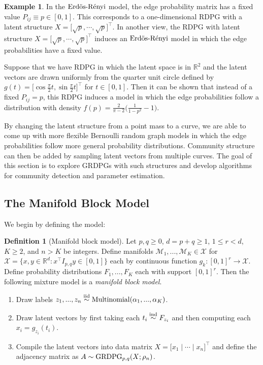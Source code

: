 \documentclass[
  12pt,
]{article}
\theoremstyle{definition}
\newtheorem{definition}{Definition}[section]
\theoremstyle{definition}
\newtheorem{example}{Example}[section]
\theoremstyle{definition}
\theoremstyle{definition}
\theoremstyle{remark}
\begin{document}
\begin{example}
\label{ex:er-curve}
In the $\text{Erd\"{o}s-R\'{e}nyi}$ model, the edge probability matrix has a fixed value $P_{ij} \equiv p \in [0, 1]$. 
This corresponds to a one-dimensional RDPG with a latent structure $X = \Big[ \sqrt{p},  \cdots, \sqrt{p} \Big]^\top$. 
In another view, the RDPG with latent structure $X = \Big[ \sqrt{p}, \cdots, \sqrt{p} \Big]^\top$ induces an $\text{Erd\"{o}s-R\'{e}nyi}$ model in which the edge probabilities have a fixed value. 

Suppose that we have RDPG in which the latent space is in $\mathbb{R}^2$ and the latent vectors are drawn uniformly from the quarter unit circle defined by $g(t) = \Big[ \cos \frac{\pi}{2} t, \sin \frac{\pi}{2} t \Big]^\top$ for $t \in [0, 1]$. 
Then it can be shown that instead of a fixed $P_{ij} = p$, this RDPG induces a model in which the edge probabilities follow a distribution with density $f(p) = \frac{2}{\pi - 2} \Big( \frac{1}{1 - p^2} - 1 \Big)$. 
\end{example}

By changing the latent structure from a point mass to a curve, we are able to come up with more flexible Bernoulli random graph models in which the edge probabilities follow more general probability distributions.
Community structure can then be added by sampling latent vectors from multiple curves.
The goal of this section is to explore GRDPGs with such structures and develop algorithms for community detection and parameter estimation.

\hypertarget{the-manifold-block-model}{%
\subsection{The Manifold Block Model}\label{the-manifold-block-model}}

We begin by defining the model:

\begin{definition}[Manifold block model]
\label{def:mbm}
Let $p, q \geq 0$, $d = p + q \geq 1$, $1 \leq r < d$, $K \geq 2$, and $n > K$ be integers. 
Define manifolds $\mathcal{M}_1, ..., \mathcal{M}_K \in \mathcal{X}$ for $\mathcal{X} = \{x, y \in \mathbb{R}^d : x^\top I_{p,q} y \in [0, 1]\}$ each by continuous function $g_k : [0, 1]^r \to \mathcal{X}$. 
Define probability distributions $F_1, ..., F_K$ each with support $[0, 1]^r$. 
Then the following mixture model is a {\em manifold block model}.

\begin{enumerate}
\item Draw labels $z_1, ..., z_n \stackrel{\mathrm{iid}}{\sim} \mathrm{Multinomial}(\alpha_1, ..., \alpha_K)$.
\item Draw latent vectors by first taking each $t_i \stackrel{\mathrm{ind}}{\sim} F_{z_i}$ and then computing each $x_i = g_{z_i}(t_i)$. 
\item Compile the latent vectors into data matrix $X = \Big[ x_1 \mid \cdots \mid x_n \Big]^\top$ and define the adjacency matrix as $A \sim \mathrm{GRDPG}_{p,q}(X; \rho_n)$. 
\end{enumerate}
\end{definition}
\end{document}
